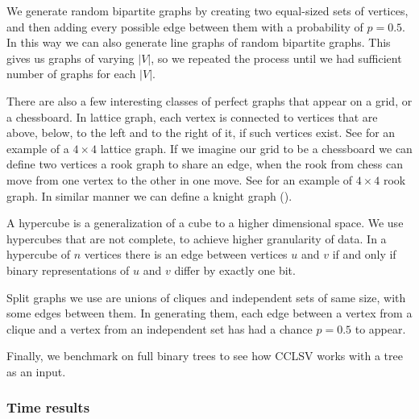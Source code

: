
We generate random bipartite graphs by creating two equal-sized sets of vertices, and then adding every possible edge between them with a probability of $p = 0.5$. In this way we can also generate line graphs of random bipartite graphs. This gives us graphs of varying $|V|$, so we repeated the process until we had sufficient number of graphs for each $|V|$.

There are also a few interesting classes of perfect graphs that appear on a grid, or a chessboard. In lattice graph, each vertex is connected to vertices that are above, below, to the left and to the right of it, if such vertices exist. See  for an example of a $4 \times 4$ lattice graph. If we imagine our grid to be a chessboard we can define two vertices a rook graph to share an edge, when the rook from chess can move from one vertex to the other in one move. See  for an example of $4 \times 4$ rook graph. In similar manner we can define a knight graph ().

A hypercube is a generalization of a cube to a higher dimensional space. We use hypercubes that are not complete, to achieve higher granularity of data. In a hypercube of $n$ vertices there is an edge between vertices $u$ and $v$ if and only if binary representations of $u$ and $v$ differ by exactly one bit.

Split graphs we use are unions of cliques and independent sets of same size, with some edges between them. In generating them, each edge between a vertex from a clique and a vertex from an independent set has had a chance $p = 0.5$ to appear.

Finally, we benchmark on full binary trees to see how CCLSV works with a tree as an input.

\subsubsection{Time results}

